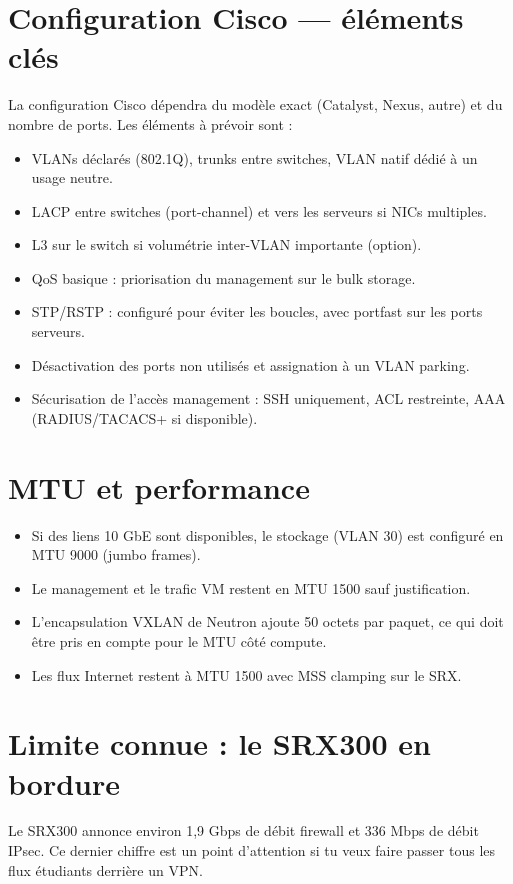 \section{Configuration Cisco — éléments clés}
\begin{todobox}
La configuration Cisco dépendra du modèle exact (Catalyst, Nexus, autre) et du nombre de ports. Les éléments à prévoir sont :
\begin{itemize}
  \item VLANs déclarés (802.1Q), trunks entre switches, VLAN natif dédié à un usage neutre.
  \item LACP entre switches (port-channel) et vers les serveurs si NICs multiples.
  \item L3 sur le switch si volumétrie inter-VLAN importante (option).
  \item QoS basique : priorisation du management sur le bulk storage.
  \item STP/RSTP : configuré pour éviter les boucles, avec portfast sur les ports serveurs.
  \item Désactivation des ports non utilisés et assignation à un VLAN parking.
  \item Sécurisation de l'accès management : SSH uniquement, ACL restreinte, AAA (RADIUS/TACACS+ si disponible).
\end{itemize}
\end{todobox}

\section{MTU et performance}
\begin{itemize}
  \item Si des liens 10 GbE sont disponibles, le stockage (VLAN 30) est configuré en MTU 9000 (jumbo frames).
  \item Le management et le trafic VM restent en MTU 1500 sauf justification.
  \item L'encapsulation VXLAN de Neutron ajoute 50 octets par paquet, ce qui doit être pris en compte pour le MTU côté compute.
  \item Les flux Internet restent à MTU 1500 avec MSS clamping sur le SRX.
\end{itemize}

\section{Limite connue : le SRX300 en bordure}
Le SRX300 annonce environ 1,9 Gbps de débit firewall et 336 Mbps de débit IPsec. Ce dernier chiffre est un point d'attention si tu veux faire passer tous les flux étudiants derrière un VPN.

